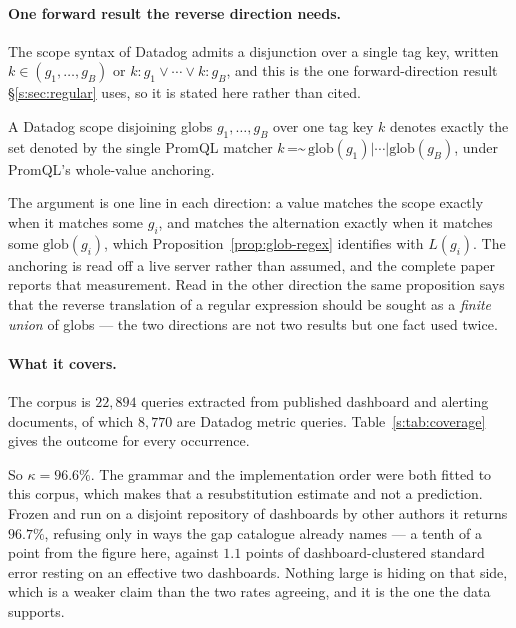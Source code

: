 \paragraph{One forward result the reverse direction needs.}
The scope syntax of Datadog admits a disjunction over a single tag key, written
$k \in (g_1,\dots,g_B)$ or $k{:}g_1 \vee \cdots \vee k{:}g_B$, and this is the one
forward-direction result \S\ref{s:sec:regular} uses, so it is stated here rather than
cited.

\begin{proposition}\label{prop:disjunction}
A Datadog scope disjoining globs $g_1,\dots,g_B$ over one tag key $k$ denotes exactly the
set denoted by the single PromQL matcher
$k\,\texttt{=\textasciitilde{}}\,\mathrm{glob}(g_1)\texttt{|}\cdots\texttt{|}\mathrm{glob}(g_B)$,
under PromQL's whole-value anchoring.
\end{proposition}

\noindent
The argument is one line in each direction: a value matches the scope exactly when it
matches some $g_i$, and matches the alternation exactly when it matches some
$\mathrm{glob}(g_i)$, which Proposition~\ref{prop:glob-regex} identifies with $L(g_i)$.
The anchoring is read off a live server rather than assumed, and the complete paper
reports that measurement. Read in the other direction the same proposition says that the
reverse translation of a regular expression should be sought as a \emph{finite union} of
globs --- the two directions are not two results but one fact used twice.

\paragraph{What it covers.}
The corpus is $22{,}894$ queries extracted from published dashboard and alerting
documents, of which $8{,}770$ are Datadog metric queries. Table~\ref{s:tab:coverage}
gives the outcome for every occurrence.

\begin{table}[htbp]\centering\footnotesize

\caption{Outcomes over the $8{,}770$ Datadog metric query occurrences. Shares are of
occurrences and of distinct query strings respectively; a query used on forty dashboards
counts forty times in the first and once in the second.}
\label{s:tab:coverage}
\end{table}

So $\kappa=96.6\%$. The grammar and the implementation order were both fitted to this
corpus, which makes that a resubstitution estimate and not a prediction. Frozen and run
on a disjoint repository of dashboards by other authors it returns $96.7\%$, refusing
only in ways the gap catalogue already names --- a tenth of a point from the figure here,
against $1.1$ points of dashboard-clustered standard error resting on an effective two
dashboards. Nothing large is hiding on that side, which is a weaker claim than the two
rates agreeing, and it is the one the data supports.


